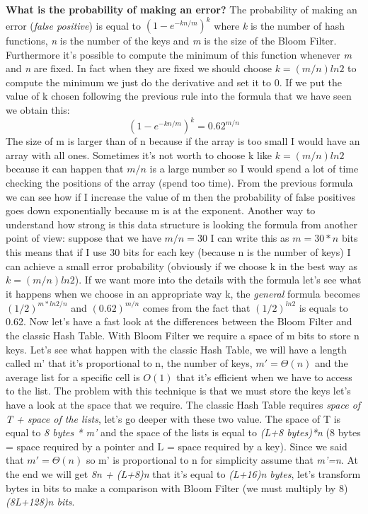 \textbf{What is the probability of making an error?} The probability of making an error (\textit{false positive}) is equal to $(1-e^{-kn/m})^k$ where \textit{k} is the number of hash functions, \textit{n} is the number of the keys and \textit{m} is the size of the Bloom Filter. Furthermore it's possible to compute the minimum of this function whenever \textit{m} and \textit{n} are fixed. In fact when they are fixed we should choose $k=(m/n)ln2$ to compute the minimum we just do the derivative and set it to 0.\newline
If we put the value of k chosen following the previous rule into the formula that we have seen we obtain this:
\begin{equation}
    (1-e^{-kn/m})^k=0.62^{m/n}
\end{equation}
The size of m is larger than of n because if the array is too small I would have an array with all ones. Sometimes it's not worth to choose k like $k=(m/n)ln2$ because it can happen that $m/n$ is a large number so I would spend a lot of time checking the positions of the array (spend too time).\newline
From the previous formula we can see how if I increase the value of m then the probability of false positives goes down exponentially because m is at the exponent. Another way to understand how strong is this data structure is looking the formula from another point of view: suppose that we have $m/n=30$ I can write this as $m=30*n$ bits this means that if I use 30 bits for each key (because n is the number of keys) I can achieve a small error probability (obviously if we choose k in the best way as $k=(m/n)ln2$).\newline
If we want more into the details with the formula let's see what it happens when we choose in an appropriate way k, the \textit{general} formula becomes $(1/2)^{m*ln2/n}$ and $(0.62)^{m/n}$ comes from the fact that $(1/2)^{ln2}$ is equals to 0.62.\newline
Now let's have a fast look at the differences between the Bloom Filter and the classic Hash Table. With Bloom Filter we require a space of m bits to store n keys. Let's see what happen with the classic Hash Table, we will have a length called m' that it's proportional to n, the number of keys, $m'=\Theta(n)$ and the average list for a specific cell is $O(1)$ that it's efficient when we have to access to the list. The problem with this technique is that we must store the keys let's have a look at the space that we require. The classic Hash Table requires \textit{space of T + space of the lists}, let's go deeper with these two value. The space of T is equal to \textit{8 bytes * m'} and the space of the lists is equal to \textit{(L+8 bytes)*n} (8 bytes = space required by a pointer and L = space required by a key). Since we said that $m'=\Theta(n)$ so m' is proportional to n for simplicity assume that \textit{m'=n}. At the end we will get \textit{8n + (L+8)n} that it's equal to \textit{(L+16)n bytes}, let's transform bytes in bits to make a comparison with Bloom Filter (we must multiply by 8) \textit{(8L+128)n bits}.\newline
